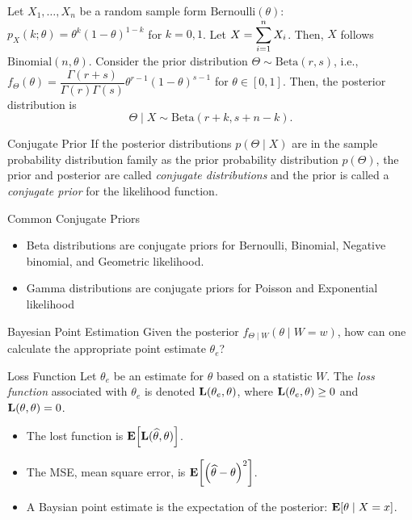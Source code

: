 \begin{eg}
	Let $X_1,\dots,X_n$ be a random sample form $\text{Bernoulli}(\theta)$: $p_X(k;\theta)=\theta^k(1-\theta)^{1-k}$ for $k=0,1$. Let $X=\displaystyle\sum_{i=1}^nX_i$. Then, $X$ follows $\text{Binomial}(n,\theta)$. Consider the prior distribution $\Theta\sim\text{Beta}(r,s)$, i.e., $f_\Theta(\theta)=\dfrac{\Gamma(r+s)}{\Gamma(r)\Gamma(s)}\theta^{r-1}(1-\theta)^{s-1}$ for $\theta\in[0,1]$. Then, the posterior distribution is \[\Theta\mid X\sim\text{Beta}(r+k, s+n-k).\]
\end{eg}
\begin{df}{Conjugate Prior}
	If the posterior distributions $p(\Theta\mid X)$ are in the sample probability distribution family as the prior probability distribution $p(\Theta)$, the prior and posterior are called \textit{conjugate distributions} and the prior is called a \textit{conjugate prior} for the likelihood function.	
\end{df}
\begin{rmk}
	Common Conjugate Priors
	\begin{itemize}
		\item Beta distributions are conjugate priors for Bernoulli, Binomial, Negative binomial, and Geometric likelihood.
		\item Gamma distributions are conjugate priors for Poisson and Exponential likelihood
	\end{itemize}	
\end{rmk}
\begin{df}{Bayesian Point Estimation}
	Given the posterior $f_{\Theta\mid W}(\theta\mid W=w)$, how can one calculate the appropriate point estimate $\theta_e$?
\end{df}
\begin{df}{Loss Function}
	Let $\theta_e$ be an estimate for $\theta$ based on a statistic $W$. The \textit{loss function} associated with $\theta_e$ is denoted $\vb{L}(\theta_e,\theta)$, where $\vb{L}(\theta_e,\theta)\geq0$ and $\vb{L}(\theta,\theta)=0$.	
\end{df}
\begin{itemize}
	\item The lost function is $\vb{E}\qty[\vb{L}(\widehat\theta,\theta)]$.
	\item The MSE, mean square error, is $\vb{E}\qty[\qty(\widehat\theta-\theta)^2]$.
	\item A Baysian point estimate is the expectation of the posterior: $\vb{E}\qty[\theta\mid X=x]$.
\end{itemize}

